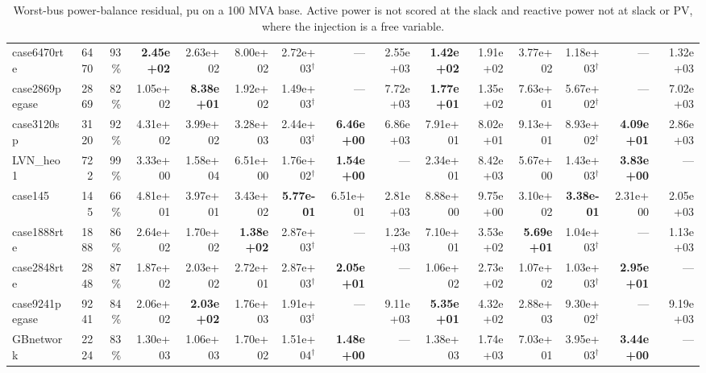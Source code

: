 \documentclass[10pt]{article}
\begin{document}
\begin{landscape}
\begin{table}[H]
\begin{tabular}{lrr rrrrrr rrrrrr}
case6470rte & 6470 & 93\% & \textbf{2.45e+02} & 2.63e+02 & 8.00e+02 & 2.72e+03$^\dagger$ & --- & 2.55e+03 & \textbf{1.42e+02} & 1.91e+02 & 3.77e+02 & 1.18e+03$^\dagger$ & --- & 1.32e+03 \\
case2869pegase & 2869 & 82\% & 1.05e+02 & \textbf{8.38e+01} & 1.92e+02 & 1.49e+03$^\dagger$ & --- & 7.72e+03 & \textbf{1.77e+01} & 1.35e+02 & 7.63e+01 & 5.67e+02$^\dagger$ & --- & 7.02e+03 \\
case3120sp & 3120 & 92\% & 4.31e+02 & 3.99e+02 & 3.28e+03 & 2.44e+03$^\dagger$ & \textbf{6.46e+00} & 6.86e+03 & 7.91e+01 & 8.02e+01 & 9.13e+01 & 8.93e+02$^\dagger$ & \textbf{4.09e+01} & 2.86e+03 \\
LVN\_heo1 & 722 & 99\% & 3.33e+00 & 1.58e+04 & 6.51e+00 & 1.76e+02$^\dagger$ & \textbf{1.54e+00} & --- & 2.34e+01 & 8.42e+03 & 5.67e+00 & 1.43e+03$^\dagger$ & \textbf{3.83e+00} & --- \\
case145 & 145 & 66\% & 4.81e+01 & 3.97e+01 & 3.43e+02 & \textbf{5.77e-01} & 6.51e+01 & 2.81e+03 & 8.88e+00 & 9.75e+00 & 3.10e+02 & \textbf{3.38e-01} & 2.31e+00 & 2.05e+03 \\
case1888rte & 1888 & 86\% & 2.64e+02 & 1.70e+02 & \textbf{1.38e+02} & 2.87e+03$^\dagger$ & --- & 1.23e+03 & 7.10e+01 & 3.53e+02 & \textbf{5.69e+01} & 1.04e+03$^\dagger$ & --- & 1.13e+03 \\
case2848rte & 2848 & 87\% & 1.87e+02 & 2.03e+02 & 2.72e+01 & 2.87e+03$^\dagger$ & \textbf{2.05e+01} & --- & 1.06e+02 & 2.73e+02 & 1.07e+02 & 1.03e+03$^\dagger$ & \textbf{2.95e+01} & --- \\
case9241pegase & 9241 & 84\% & 2.06e+02 & \textbf{2.03e+02} & 1.76e+03 & 1.91e+03$^\dagger$ & --- & 9.11e+03 & \textbf{5.35e+01} & 4.32e+02 & 2.88e+03 & 9.30e+02$^\dagger$ & --- & 9.19e+03 \\
GBnetwork & 2224 & 83\% & 1.30e+03 & 1.06e+03 & 1.70e+02 & 1.51e+04$^\dagger$ & \textbf{1.48e+00} & --- & 1.38e+03 & 1.74e+03 & 7.03e+01 & 3.95e+03$^\dagger$ & \textbf{3.44e+00} & --- \\
\bottomrule
\end{tabular}
\caption{Worst-bus power-balance residual, pu on a 100 MVA base. Active power is not scored at the slack and reactive power not at slack or PV, where the injection is a free variable.}
\end{table}
\end{landscape}
\end{document}

